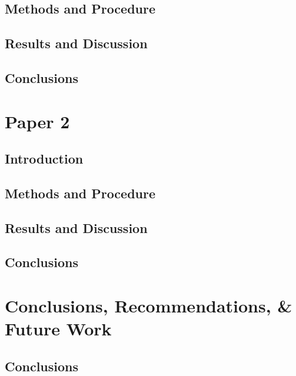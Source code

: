   \section{Methods and Procedure}\label{sec:P1MnP}
    \begin{case}
      \lipsum[10]
    \end{case}
    \begin{case}
      \lipsum[15]
    \end{case}
    \lipsum[46-48]
  \section{Results and Discussion}\label{sec:P1RnD}
    \lipsum[55-57]
  \section{Conclusions}\label{sec:P1Conclusion}
    \lipsum[12-13]
                
\chapter{Paper 2}\label{ch:Paper2}
  \section{Introduction}\label{sec:P2Intro}
    \lipsum[34-36]
  \section{Methods and Procedure}\label{sec:P2MnP}
    \lipsum[46-48]
  \section{Results and Discussion}\label{sec:P2RnD}
    \lipsum[55-57]
  \section{Conclusions}\label{sec:P2Conclusion}
    \lipsum[12-13]
                
\chapter{Conclusions, Recommendations, \& Future Work}\label{ch:Conclusions}
  \section{Conclusions}\label{sec:Conclusions}
    \lipsum[34-36]
